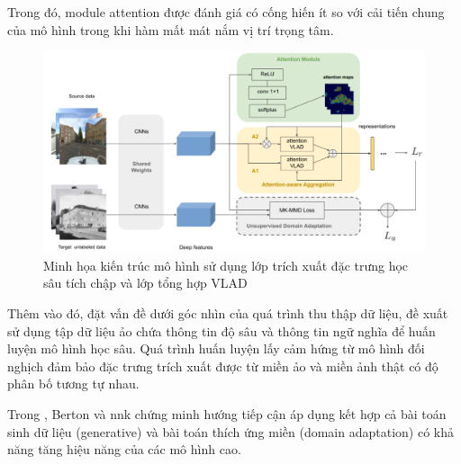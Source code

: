 Trong đó, module attention được đánh giá có cống hiến ít so với cải tiến chung của mô hình trong khi hàm mất mát nắm vị trí trọng tâm.

\begin{figure}[h]
    \centering
    \includegraphics[width=\textwidth]{pics/Chapter2/cnn160.png}
    \caption{Minh họa kiến trúc mô hình sử dụng lớp trích xuất đặc trưng học sâu tích chập và lớp tổng hợp VLAD \cite{wang2019attention}}
\end{figure}

Thêm vào đó, đặt vấn đề dưới góc nhìn của quá trình thu thập dữ liệu, \cite{hu2020dasgil} đề xuất sử dụng tập dữ liệu ảo chứa thông tin độ sâu và thông tin ngữ nghĩa để huấn luyện mô hình học sâu. Quá trình huấn luyện lấy cảm hứng từ mô hình đối nghịch đảm bảo đặc trưng trích xuất được từ miền ảo và miền ảnh thật có độ phân bố tương tự nhau.

Trong \cite{PAOLICELLI-2022-FRONTIERS}, Berton và nnk chứng minh hướng tiếp cận áp dụng kết hợp cả bài toán sinh dữ liệu (generative) và bài toán thích ứng miền (domain adaptation) có khả năng tăng hiệu năng của các mô hình cao.
